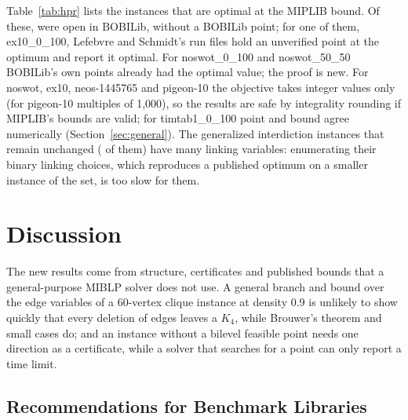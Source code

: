 \documentclass[]{spie}  %
\theoremstyle{plain}
\newcommand{\inst}[1]{\mbox{#1}}             %
\begin{document}
Table~\ref{tab:hpr} lists the \NumHprOptimal{} instances that are optimal at the MIPLIB bound.
Of these, \NumHprOpen{} were open in BOBILib, without a BOBILib point; for one of them,
\inst{ex10\_0\_100}, Lefebvre and Schmidt's run files hold an unverified point at the optimum
\ExTenOptimum{} and report it optimal. For \inst{noswot\_0\_100} and \inst{noswot\_50\_50} BOBILib's
own points already had the optimal value; the proof is new. For \inst{noswot}, \inst{ex10},
\inst{neos-1445765} and \inst{pigeon-10} the objective takes integer values only (for
\inst{pigeon-10} multiples of 1,000), so the results are safe by integrality rounding if MIPLIB's
bounds are valid; for \inst{timtab1\_0\_100} point and bound agree numerically
(Section~\ref{sec:general}). The generalized interdiction instances
that remain unchanged (\NumGeneralizedUnchanged{} of them) have many linking variables:
enumerating their binary linking choices, which reproduces a published optimum on a smaller
instance of the set, is too slow for them.

\section{Discussion}\label{sec:discussion}

The new results come from structure, certificates and published bounds that a general-purpose
MIBLP solver does not use. A general branch and bound over the \CliqueMSixtyNine{} edge variables
of a 60-vertex clique instance at density 0.9 is unlikely to show quickly that every deletion of
\CliqueKSixtyNine{} edges leaves a $K_4$, while Brouwer's theorem and \NumCliquePartCases{} small
cases do; and an instance without a bilevel feasible point needs one direction as a certificate,
while a solver that searches for a point can only report a time limit.

\subsection{Recommendations for Benchmark Libraries}
\end{document}
